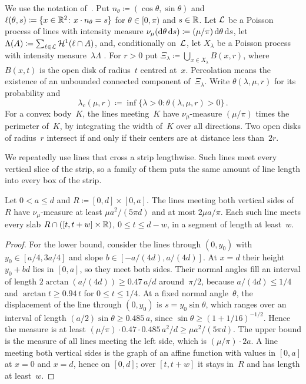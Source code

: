 \documentclass[11pt,letterpaper]{article}
\begin{document}
We use the notation of~\cite{HJ26}. Put $n_\theta\coloneqq(\cos\theta,\sin\theta)$ and $\ell(\theta,s)\coloneqq\{x\in\mathbb R^2\colon x\cdot n_\theta=s\}$ for $\theta\in[0,\pi)$ and $s\in\mathbb R$. Let $\mathcal L$ be a Poisson process of lines with intensity measure $\nu_\mu(\mathrm{d}\theta\,\mathrm{d} s)\coloneqq(\mu/\pi)\,\mathrm{d}\theta\,\mathrm{d} s$, let $\Lambda(A)\coloneqq\sum_{\ell\in\mathcal L}\mathcal H^1(\ell\cap A)$, and, conditionally on~$\mathcal L$, let $X_\lambda$ be a Poisson process with intensity measure~$\lambda\Lambda$ \cite[Theorem~5.6]{LP17}. For $r>0$ put $\Xi_\lambda\coloneqq\bigcup_{x\in X_\lambda}B(x,r)$, where $B(x,t)$ is the open disk of radius~$t$ centred at~$x$. Percolation means the existence of an unbounded connected component of~$\Xi_\lambda$. Write $\theta(\lambda,\mu,r)$ for its probability and
\begin{equation*}
  \lambda_c(\mu,r)\coloneqq\inf\{\lambda>0\colon\theta(\lambda,\mu,r)>0\}\,.
\end{equation*}
For a convex body~$K$, the lines meeting~$K$ have $\nu_\mu$-measure $(\mu/\pi)$ times the perimeter of~$K$, by integrating the width of~$K$ over all directions. Two open disks of radius~$r$ intersect if and only if their centers are at distance less than~$2r$.

We repeatedly use lines that cross a strip lengthwise. Such lines meet every vertical slice of the strip, so a family of them puts the same amount of line length into every box of the strip.

\begin{lemma}
\label{lem:strip}
Let $0<a\le d$ and $R\coloneqq[0,d]\times[0,a]$. The lines meeting both vertical sides of~$R$ have $\nu_\mu$-measure at least $\mu a^2/(5\pi d)$ and at most $2\mu a/\pi$. Each such line meets every slab $R\cap([t,t+w]\times\mathbb R)$, $0\le t\le d-w$, in a segment of length at least~$w$.
\end{lemma}

\begin{proof}
For the lower bound, consider the lines through $(0,y_0)$ with $y_0\in[a/4,3a/4]$ and slope $b\in[-a/(4d),a/(4d)]$. At $x=d$ their height $y_0+bd$ lies in $[0,a]$, so they meet both sides. Their normal angles fill an interval of length $2\arctan(a/(4d))\ge0.47\,a/d$ around~$\pi/2$, because $a/(4d)\le1/4$ and $\arctan t\ge0.94\,t$ for $0\le t\le1/4$. At a fixed normal angle~$\theta$, the displacement of the line through $(0,y_0)$ is $s=y_0\sin\theta$, which ranges over an interval of length $(a/2)\sin\theta\ge0.485\,a$, since $\sin\theta\ge(1+1/16)^{-1/2}$. Hence the measure is at least $(\mu/\pi)\cdot0.47\cdot0.485\,a^2/d\ge\mu a^2/(5\pi d)$. The upper bound is the measure of all lines meeting the left side, which is $(\mu/\pi)\cdot2a$. A line meeting both vertical sides is the graph of an affine function with values in $[0,a]$ at $x=0$ and $x=d$, hence on $[0,d]$; over $[t,t+w]$ it stays in~$R$ and has length at least~$w$.
\end{proof}
\end{document}
